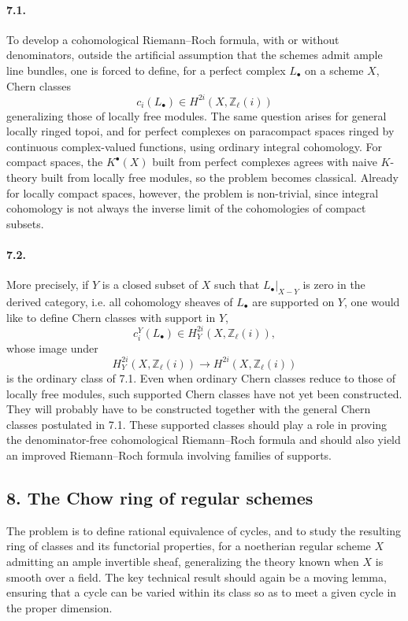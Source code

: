 \documentclass[11pt]{article}
\theoremstyle{plain}
\theoremstyle{definition}
\theoremstyle{remark}
\newcommand{\ZZ}{\mathbb Z}
\newcommand{\longto}{\longrightarrow}
\begin{document}
\paragraph{7.1.}
To develop a cohomological Riemann--Roch formula, with or without denominators, outside the artificial assumption that the schemes admit ample line bundles, one is forced to define, for a perfect complex $L_\bullet$ on a scheme $X$, Chern classes
\[
c_i(L_\bullet)\in H^{2i}(X,\ZZ_\ell(i))
\]
generalizing those of locally free modules. The same question arises for general locally ringed topoi, and for perfect complexes on paracompact spaces ringed by continuous complex-valued functions, using ordinary integral cohomology. For compact spaces, the $K^\bullet(X)$ built from perfect complexes agrees with naive $K$-theory built from locally free modules, so the problem becomes classical. Already for locally compact spaces, however, the problem is non-trivial, since integral cohomology is not always the inverse limit of the cohomologies of compact subsets.

\paragraph{7.2.}
More precisely, if $Y$ is a closed subset of $X$ such that $L_\bullet|_{X-Y}$ is zero in the derived category, i.e. all cohomology sheaves of $L_\bullet$ are supported on $Y$, one would like to define Chern classes with support in $Y$,
\[
c_i^Y(L_\bullet)\in H_Y^{2i}(X,\ZZ_\ell(i)),
\]
whose image under
\[
H_Y^{2i}(X,\ZZ_\ell(i))\longto H^{2i}(X,\ZZ_\ell(i))
\]
is the ordinary class of 7.1. Even when ordinary Chern classes reduce to those of locally free modules, such supported Chern classes have not yet been constructed. They will probably have to be constructed together with the general Chern classes postulated in 7.1. These supported classes should play a role in proving the denominator-free cohomological Riemann--Roch formula and should also yield an improved Riemann--Roch formula involving families of supports.

\subsection*{8. The Chow ring of regular schemes}

The problem is to define rational equivalence of cycles, and to study the resulting ring of classes and its functorial properties, for a noetherian regular scheme $X$ admitting an ample invertible sheaf, generalizing the theory known when $X$ is smooth over a field. The key technical result should again be a moving lemma, ensuring that a cycle can be varied within its class so as to meet a given cycle in the proper dimension.
\end{document}
